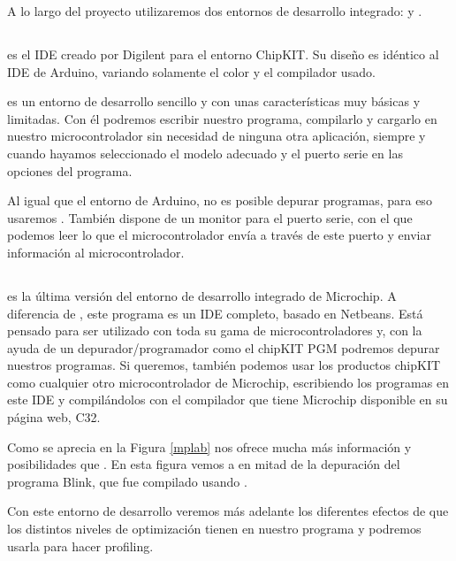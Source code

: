 A lo largo del proyecto utilizaremos dos entornos de desarrollo integrado:  y .

\subsection{}
\cite{website:mpide} es el IDE creado por Digilent para el entorno ChipKIT. Su diseño es idéntico al IDE de Arduino, variando solamente el color y el compilador usado.

 es un entorno de desarrollo sencillo y con unas características muy básicas y limitadas. Con él podremos escribir nuestro programa, compilarlo y cargarlo en nuestro microcontrolador sin necesidad de ninguna otra aplicación, siempre y cuando hayamos seleccionado el modelo adecuado y el puerto serie en las opciones del programa.

Al igual que el entorno de Arduino, no es posible depurar programas, para eso usaremos . También dispone de un monitor para el puerto serie, con el que podemos leer lo que el microcontrolador envía a través de este puerto y enviar información al microcontrolador.

\subsection{} 
\cite{website:mplab} es la última versión del entorno de desarrollo integrado de Microchip. A diferencia de
, este programa es un IDE completo, basado en Netbeans. Está pensado para ser utilizado con toda su gama de microcontroladores y, con la ayuda de un depurador/programador como el chipKIT PGM podremos depurar nuestros programas. Si queremos, también podemos usar los productos chipKIT como cualquier otro microcontrolador de Microchip, escribiendo los programas en este IDE y compilándolos con el compilador que tiene Microchip disponible en su página web, C32\cite{website:c32}. 

Como se aprecia en la Figura \ref{mplab}  nos ofrece mucha más información y posibilidades que . En esta figura vemos a  en mitad de la depuración del programa Blink, que fue compilado usando .

Con este entorno de desarrollo veremos más adelante los diferentes efectos de que los distintos niveles de optimización tienen en nuestro programa y podremos usarla para hacer profiling.


